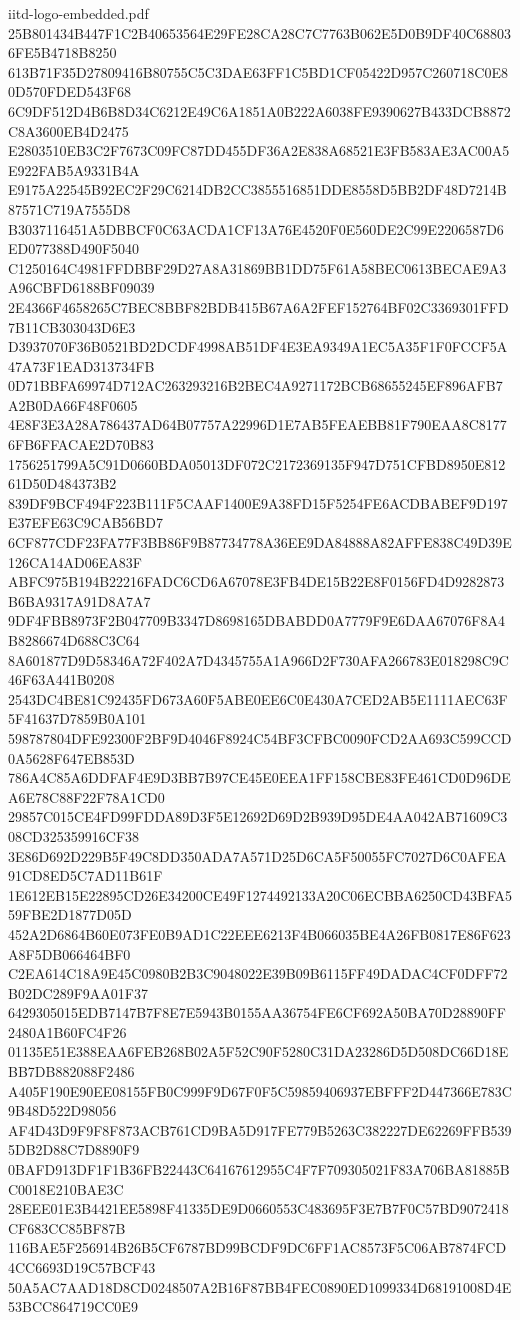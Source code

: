 \begin{filecontents*}[overwrite]{iitd-logo-embedded.pdf}
25B801434B447F1C2B40653564E29FE28CA28C7C7763B062E5D0B9DF40C688036FE5B4718B8250
613B71F35D27809416B80755C5C3DAE63FF1C5BD1CF05422D957C260718C0E80D570FDED543F68
6C9DF512D4B6B8D34C6212E49C6A1851A0B222A6038FE9390627B433DCB8872C8A3600EB4D2475
E2803510EB3C2F7673C09FC87DD455DF36A2E838A68521E3FB583AE3AC00A5E922FAB5A9331B4A
E9175A22545B92EC2F29C6214DB2CC3855516851DDE8558D5BB2DF48D7214B87571C719A7555D8
B3037116451A5DBBCF0C63ACDA1CF13A76E4520F0E560DE2C99E2206587D6ED077388D490F5040
C1250164C4981FFDBBF29D27A8A31869BB1DD75F61A58BEC0613BECAE9A3A96CBFD6188BF09039
2E4366F4658265C7BEC8BBF82BDB415B67A6A2FEF152764BF02C3369301FFD7B11CB303043D6E3
D3937070F36B0521BD2DCDF4998AB51DF4E3EA9349A1EC5A35F1F0FCCF5A47A73F1EAD313734FB
0D71BBFA69974D712AC263293216B2BEC4A9271172BCB68655245EF896AFB7A2B0DA66F48F0605
4E8F3E3A28A786437AD64B07757A22996D1E7AB5FEAEBB81F790EAA8C81776FB6FFACAE2D70B83
1756251799A5C91D0660BDA05013DF072C2172369135F947D751CFBD8950E81261D50D484373B2
839DF9BCF494F223B111F5CAAF1400E9A38FD15F5254FE6ACDBABEF9D197E37EFE63C9CAB56BD7
6CF877CDF23FA77F3BB86F9B87734778A36EE9DA84888A82AFFE838C49D39E126CA14AD06EA83F
ABFC975B194B22216FADC6CD6A67078E3FB4DE15B22E8F0156FD4D9282873B6BA9317A91D8A7A7
9DF4FBB8973F2B047709B3347D8698165DBABDD0A7779F9E6DAA67076F8A4B8286674D688C3C64
8A601877D9D58346A72F402A7D4345755A1A966D2F730AFA266783E018298C9C46F63A441B0208
2543DC4BE81C92435FD673A60F5ABE0EE6C0E430A7CED2AB5E1111AEC63F5F41637D7859B0A101
598787804DFE92300F2BF9D4046F8924C54BF3CFBC0090FCD2AA693C599CCD0A5628F647EB853D
786A4C85A6DDFAF4E9D3BB7B97CE45E0EEA1FF158CBE83FE461CD0D96DEA6E78C88F22F78A1CD0
29857C015CE4FD99FDDA89D3F5E12692D69D2B939D95DE4AA042AB71609C308CD325359916CF38
3E86D692D229B5F49C8DD350ADA7A571D25D6CA5F50055FC7027D6C0AFEA91CD8ED5C7AD11B61F
1E612EB15E22895CD26E34200CE49F1274492133A20C06ECBBA6250CD43BFA559FBE2D1877D05D
452A2D6864B60E073FE0B9AD1C22EEE6213F4B066035BE4A26FB0817E86F623A8F5DB066464BF0
C2EA614C18A9E45C0980B2B3C9048022E39B09B6115FF49DADAC4CF0DFF72B02DC289F9AA01F37
6429305015EDB7147B7F8E7E5943B0155AA36754FE6CF692A50BA70D28890FF2480A1B60FC4F26
01135E51E388EAA6FEB268B02A5F52C90F5280C31DA23286D5D508DC66D18EBB7DB882088F2486
A405F190E90EE08155FB0C999F9D67F0F5C59859406937EBFFF2D447366E783C9B48D522D98056
AF4D43D9F9F8F873ACB761CD9BA5D917FE779B5263C382227DE62269FFB5395DB2D88C7D8890F9
0BAFD913DF1F1B36FB22443C64167612955C4F7F709305021F83A706BA81885BC0018E210BAE3C
28EEE01E3B4421EE5898F41335DE9D0660553C483695F3E7B7F0C57BD9072418CF683CC85BF87B
116BAE5F256914B26B5CF6787BD99BCDF9DC6FF1AC8573F5C06AB7874FCD4CC6693D19C57BCF43
50A5AC7AAD18D8CD0248507A2B16F87BB4FEC0890ED1099334D68191008D4E53BCC864719CC0E9

\end{filecontents*}
